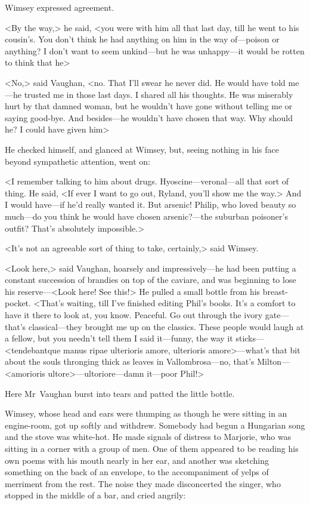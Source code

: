 Wimsey expressed agreement.

<By the way,> he said, <you were with him all that last day, till he went to his cousin's. You don't think he had anything on him in the way of—poison or anything? I don't want to seem unkind—but he was unhappy—it would be rotten to think that he\longdash>

<No,> said Vaughan, <no. That I'll swear he never did. He would have told me—he trusted me in those last days. I shared all his thoughts. He was miserably hurt by that damned woman, but he wouldn't have gone without telling me or saying good-bye. And besides—he wouldn't have chosen that way. Why should he? I could have given him\longdash>

He checked himself, and glanced at Wimsey, but, seeing nothing in his face beyond sympathetic attention, went on:

<I remember talking to him about drugs. Hyoscine—veronal—all that sort of thing. He said, <If ever I want to go out, Ryland, you'll show me the way.> And I would have—if he'd really wanted it. But arsenic! Philip, who loved beauty so much—do you think he would have chosen arsenic?—the suburban poisoner's outfit? That's absolutely impossible.>

<It's not an agreeable sort of thing to take, certainly,> said Wimsey.

<Look here,> said Vaughan, hoarsely and impressively—he had been putting a constant succession of brandies on top of the caviare, and was beginning to lose his reserve—<Look here! See this!> He pulled a small bottle from his breast-pocket. <That's waiting, till I've finished editing Phil's books. It's a comfort to have it there to look at, you know. Peaceful. Go out through the ivory gate—that's classical—they brought me up on the classics. These people would laugh at a fellow, but you needn't tell them I said it—funny, the way it sticks—<tendebantque manus ripae ulterioris amore, ulterioris amore>—what's that bit about the souls thronging thick as leaves in Vallombrosa—no, that's Milton—<amorioris ultore>—ultoriore—damn it—poor Phil!>

Here Mr~Vaughan burst into tears and patted the little bottle.

Wimsey, whose head and ears were thumping as though he were sitting in an engine-room, got up softly and withdrew. Somebody had begun a Hungarian song and the stove was white-hot. He made signals of distress to Marjorie, who was sitting in a corner with a group of men. One of them appeared to be reading his own poems with his mouth nearly in her ear, and another was sketching something on the back of an envelope, to the accompaniment of yelps of merriment from the rest. The noise they made disconcerted the singer, who stopped in the middle of a bar, and cried angrily:

